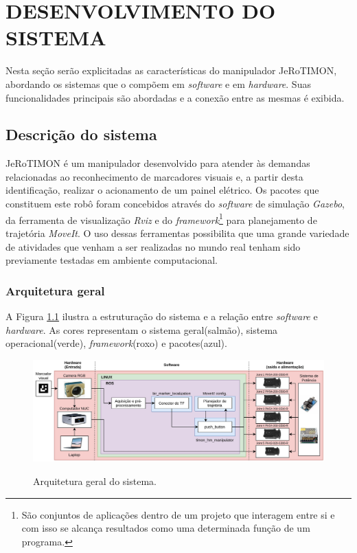\chapter{DESENVOLVIMENTO DO SISTEMA}
\label{chap:desenv}
Nesta seção serão explicitadas as características do manipulador JeRoTIMON, abordando os sistemas que o compõem em \textit{software} e em \textit{hardware}. Suas funcionalidades principais são abordadas e a conexão entre as mesmas é exibida. 

\section{Descrição do sistema}
\label{sec:descsis}

JeRoTIMON é um manipulador desenvolvido para atender às demandas relacionadas ao reconhecimento de marcadores visuais e, a partir desta identificação, realizar o acionamento de um painel elétrico. Os pacotes que constituem este robô foram concebidos através do \textit{software} de simulação \textit{Gazebo}, da ferramenta de visualização \textit{Rviz} e do \textit{framework}\footnote{São conjuntos de aplicações dentro de um projeto que interagem entre si e com isso se alcança resultados como uma determinada função de um programa.} para planejamento de trajetória \textit{MoveIt}. O uso dessas ferramentas possibilita que uma grande variedade de atividades que venham a ser realizadas no mundo real tenham sido previamente testadas em ambiente computacional.

\subsection{Arquitetura geral}
\label{sub:arqg}

A Figura \ref{fig:arquitetura_geral} ilustra a estruturação do sistema e a relação entre \textit{software} e \textit{hardware}. As cores representam o sistema geral(salmão), sistema operacional(verde), \textit{framework}(roxo) e pacotes(azul).
\begin{figure}[H]
  \caption{Arquitetura geral do sistema.}
  \centering
  \includegraphics[width=16 cm]{images/arquitetura_geral.jpg}
    \label{fig:arquitetura_geral}
\end{figure}

